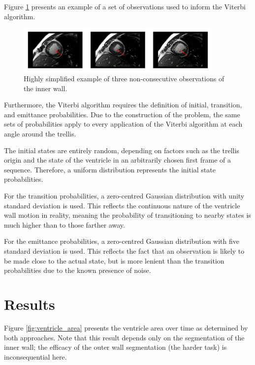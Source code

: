 Figure \ref{fig:viterbi_obs} presents an example of a set of observations used to inform the Viterbi algorithm.

\begin{figure}[ht]
  \centering
  \includegraphics[width=0.9\textwidth]{images/q1_viterbi_obs.png}
  \caption{Highly simplified example of three non-consecutive observations of the inner wall.}
  \label{fig:viterbi_obs}
\end{figure}

Furthermore, the Viterbi algorithm requires the definition of initial, transition, and emittance probabilities. Due to the construction of the problem, the same sets of probabilities apply to every application of the Viterbi algorithm at each angle around the trellis.

The initial states are entirely random, depending on factors such as the trellis origin and the state of the ventricle in an arbitrarily chosen first frame of a sequence. Therefore, a uniform distribution represents the initial state probabilities.

For the transition probabilities, a zero-centred Gaussian distribution with unity standard deviation is used. This reflects the continuous nature of the ventricle wall motion in reality, meaning the probability of transitioning to nearby states is much higher than to those farther away.

For the emittance probabilities, a zero-centred Gaussian distribution with five standard deviation is used. This reflects the fact that an observation is likely to be made close to the actual state, but is more lenient than the transition probabilities due to the known presence of noise.

\newpage
\section{Results}

Figure \ref{fig:ventricle_area} presents the ventricle area over time as determined by both approaches. Note that this result depends only on the segmentation of the inner wall; the efficacy of the outer wall segmentation (the harder task) is inconsequential here.

